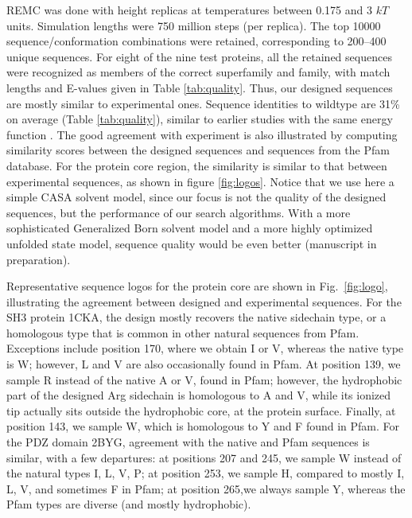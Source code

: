 REMC was done with height replicas at temperatures between 0.175 and 3 $kT$ units. Simulation lengths were 750 million steps (per replica). The top 10000 sequence/conformation combinations were retained, corresponding to 200--400 unique sequences. For eight of the nine test proteins, all the retained sequences were recognized as members of the correct superfamily and family, with match lengths and E-values given in Table \ref{tab:quality}. Thus, our designed sequences are mostly similar to experimental ones. Sequence identities to wildtype are 31\% on average (Table \ref{tab:quality}), similar to earlier studies with the same energy function \cite{Schmidt09,Schmidt10}. The good agreement with experiment is also illustrated by computing similarity scores between the designed sequences and sequences from the Pfam database. For the protein core region, the similarity is similar to that between experimental sequences, as shown in figure \ref{fig:logos}. Notice that we use here a simple CASA solvent model, since our focus is not the quality of the designed sequences, but the performance of our search algorithms. With a more sophisticated Generalized Born solvent model and a more highly optimized unfolded state model, sequence quality would be even better (manuscript in preparation).

Representative sequence logos for the protein core are shown in Fig.\ \ref{fig:logo}, illustrating the agreement between designed and experimental sequences. For the SH3 protein 1CKA, the design mostly recovers the native sidechain type, or a homologous type that is common in other natural sequences from Pfam. Exceptions include position 170, where we obtain I or V, whereas the native type is W; however, L and V are also occasionally found in Pfam. At position 139, we sample R instead of the native A or V, found in Pfam; however, the hydrophobic part of the designed Arg sidechain is homologous to A and V, while its ionized tip actually sits outside the hydrophobic core, at the protein surface. Finally, at position 143, we sample W, which is homologous to Y and F found in Pfam. For the PDZ domain 2BYG, agreement with the native and Pfam sequences is similar, with a few departures: at positions 207 and 245, we sample W instead of the natural types I, L, V, P; at position 253, we sample H, compared to mostly I, L, V, and sometimes F in Pfam; at position 265,we always sample Y, whereas the Pfam types are diverse (and mostly hydrophobic).

